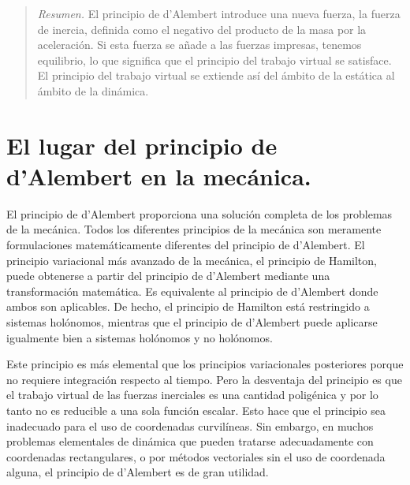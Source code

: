 \documentclass[12pt,a4paper]{book}
\begin{document}
\begin{quote}
\textit{Resumen.} El principio de d'Alembert introduce una nueva fuerza, la fuerza de inercia, definida como el negativo del producto de la masa por la aceleración. Si esta fuerza se añade a las fuerzas impresas, tenemos equilibrio, lo que significa que el principio del trabajo virtual se satisface. El principio del trabajo virtual se extiende así del ámbito de la estática al ámbito de la dinámica.
\end{quote}

\section{El lugar del principio de d'Alembert en la mecánica.}

El principio de d'Alembert proporciona una solución completa de los problemas de la mecánica. Todos los diferentes principios de la mecánica son meramente formulaciones matemáticamente diferentes del principio de d'Alembert. El principio variacional más avanzado de la mecánica, el principio de Hamilton, puede obtenerse a partir del principio de d'Alembert mediante una transformación matemática. Es equivalente al principio de d'Alembert donde ambos son aplicables. De hecho, el principio de Hamilton está restringido a sistemas holónomos, mientras que el principio de d'Alembert puede aplicarse igualmente bien a sistemas holónomos y no holónomos.

Este principio es más elemental que los principios variacionales posteriores porque no requiere integración respecto al tiempo. Pero la desventaja del principio es que el trabajo virtual de las fuerzas inerciales es una cantidad poligénica y por lo tanto no es reducible a una sola función escalar. Esto hace que el principio sea inadecuado para el uso de coordenadas curvilíneas. Sin embargo, en muchos problemas elementales de dinámica que pueden tratarse adecuadamente con coordenadas rectangulares, o por métodos vectoriales sin el uso de coordenada alguna, el principio de d'Alembert es de gran utilidad.
\end{document}
